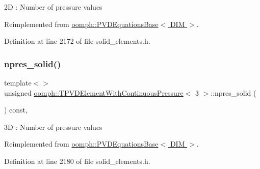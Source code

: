 2D \+: Number of pressure values 

Reimplemented from \hyperlink{classoomph_1_1PVDEquationsBase_a6e8457327151e87d2fa5694148afc7cc}{oomph\+::\+P\+V\+D\+Equations\+Base$<$ D\+I\+M $>$}.



Definition at line 2172 of file solid\+\_\+elements.\+h.

\mbox{\label{classoomph_1_1TPVDElementWithContinuousPressure_ad79413ff3f46e433ce6d8946b7378dca}} 
\subsubsection{\texorpdfstring{npres\+\_\+solid()}{npres\_solid()}\hspace{0.1cm}{\footnotesize\ttfamily [3/3]}}
{\footnotesize\ttfamily template$<$$>$ \\
unsigned \hyperlink{classoomph_1_1TPVDElementWithContinuousPressure}{oomph\+::\+T\+P\+V\+D\+Element\+With\+Continuous\+Pressure}$<$ 3 $>$\+::npres\+\_\+solid (\begin{DoxyParamCaption}{ }\end{DoxyParamCaption}) const\hspace{0.3cm}{\ttfamily [inline]}, {\ttfamily [virtual]}}

3D \+: Number of pressure values 

Reimplemented from \hyperlink{classoomph_1_1PVDEquationsBase_a6e8457327151e87d2fa5694148afc7cc}{oomph\+::\+P\+V\+D\+Equations\+Base$<$ D\+I\+M $>$}.



Definition at line 2180 of file solid\+\_\+elements.\+h.

\mbox{\label{classoomph_1_1TPVDElementWithContinuousPressure_ad2fac6714b3a38e66c4e2e837870cff7}} 
